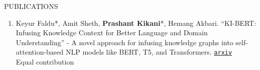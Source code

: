 \documentclass{resume}
\begin{document}
\begin{rSection}{PUBLICATIONS}
\begin{enumerate}
\item Keyur Faldu*, Amit Sheth, \textbf{Prashant Kikani}*, Hemang Akbari. ``KI-BERT: Infusing Knowledge Context for Better Language and Domain Understanding'' - A novel approach for infusing knowledge graphs into self-attention-based NLP models like BERT, T5, and Transformers. \href{https://arxiv.org/pdf/2104.08145.pdf}{\texttt{arxiv}} \\
\hspace*{0pt}\hfill * Equal contribution
\end{enumerate}




\end{rSection}

\end{document}

